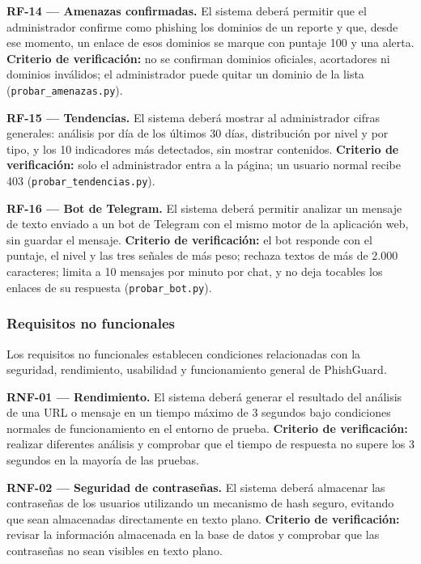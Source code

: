 \documentclass[journal,onecolumn,12pt,draftclsnofoot]{IEEEtran}
\begin{document}
\par\medskip\noindent\textbf{RF-14 --- Amenazas confirmadas.} El sistema deberá permitir que el administrador confirme como phishing los dominios de un reporte y que, desde ese momento, un enlace de esos dominios se marque con puntaje 100 y una alerta. \textbf{Criterio de verificación:} no se confirman dominios oficiales, acortadores ni dominios inválidos; el administrador puede quitar un dominio de la lista (\texttt{probar\_amenazas.py}).

\par\medskip\noindent\textbf{RF-15 --- Tendencias.} El sistema deberá mostrar al administrador cifras generales: análisis por día de los últimos 30 días, distribución por nivel y por tipo, y los 10 indicadores más detectados, sin mostrar contenidos. \textbf{Criterio de verificación:} solo el administrador entra a la página; un usuario normal recibe 403 (\texttt{probar\_tendencias.py}).

\par\medskip\noindent\textbf{RF-16 --- Bot de Telegram.} El sistema deberá permitir analizar un mensaje de texto enviado a un bot de Telegram con el mismo motor de la aplicación web, sin guardar el mensaje. \textbf{Criterio de verificación:} el bot responde con el puntaje, el nivel y las tres señales de más peso; rechaza textos de más de 2.000 caracteres; limita a 10 mensajes por minuto por chat, y no deja tocables los enlaces de su respuesta (\texttt{probar\_bot.py}).

\subsubsection{Requisitos no funcionales}

Los requisitos no funcionales establecen condiciones relacionadas con la seguridad, rendimiento, usabilidad y funcionamiento general de PhishGuard.

\par\medskip\noindent\textbf{RNF-01 --- Rendimiento.} El sistema deberá generar el resultado del análisis de una URL o mensaje en un tiempo máximo de 3 segundos bajo condiciones normales de funcionamiento en el entorno de prueba. \textbf{Criterio de verificación:} realizar diferentes análisis y comprobar que el tiempo de respuesta no supere los 3 segundos en la mayoría de las pruebas.

\par\medskip\noindent\textbf{RNF-02 --- Seguridad de contraseñas.} El sistema deberá almacenar las contraseñas de los usuarios utilizando un mecanismo de hash seguro, evitando que sean almacenadas directamente en texto plano. \textbf{Criterio de verificación:} revisar la información almacenada en la base de datos y comprobar que las contraseñas no sean visibles en texto plano.
\end{document}
